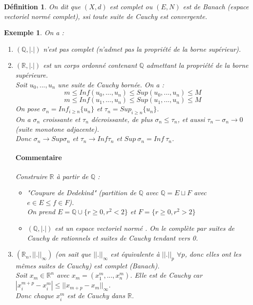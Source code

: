 \documentclass[a4paper, oneside]{report}
\theoremstyle{break}
\newtheorem{defi}[thm]{Définition}
\newtheorem{exem}[thm]{Exemple}
\newcommand{\R}{\mathbb{R}}
\newcommand{\Q}{\mathbb{Q}}
\newcommand{\evn}{espace vectoriel normé }
\begin{document}
\begin{defi}                    
On dit que $(X,d)$ est complet ou $(E,N)$ est de Banach (espace vectoriel normé complet), ssi toute suite de Cauchy est convergente.
\end{defi}

\begin{exem}

On a :
\begin{enumerate}
\item $(\Q, |.|)$ n'est pas complet (n'admet pas la propriété de la borne supérieur).
\item $(\R, |.|)$ est un corps ordonné contenant $\Q$ admettant la propriété de la borne supérieure.\\
Soit $u_0,...,u_n$ une suite de Cauchy bornée. On a :
$$m\leq Inf(u_0,...,u_n)\leq Sup(u_0,...,u_n)\leq M$$
$$m\leq Inf(u_1,...,u_n)\leq Sup(u_1,...,u_n)\leq M$$
On pose $\sigma_n=Inf_{i\geq n}\{u_n\}$ et $\tau_n=Sup_{i\geq n}\{u_n\}$.\\
On a $\sigma_n$ croissante et $\tau_n$ décroissante, de plus $\sigma_n \leq \tau_n$, et aussi $\tau_n - \sigma_n \rightarrow 0$ (suite monotone adjacente).\\
Donc $\sigma_n \rightarrow Sup\sigma_n$ et $\tau_n \rightarrow Inf \tau_n$ et $Sup~\sigma_n = Inf~\tau_n$.

\paragraph{Commentaire}
Construire $\R$ à partir de $\Q$ :
\begin{itemize}
\item "Coupure de Dedekind" (partition de $\Q$ avec $\Q=E\sqcup F$ avec $e\in E \leq f\in F$).\\
On prend $E=\Q \cup \{r\geq 0, r^2<2 \}$ et $F=\{r\geq 0, r^2>2 \}$

\item $(\Q, |.|)$ est un \evn. On le complète par {suites de Cauchy de rationnels} et {suites de Cauchy tendant vers 0}.
\end{itemize}

\item $(\R_n, ||.||_\infty)$ (on sait que $||.||_\infty$ est équivalente à $||.||_p$ $\forall p$, donc elles ont les mêmes suites de Cauchy) est complet (Banach).\\
Soit $x_m \in \R^n$ avec $x_m=(x_1^m,...,x_n^m)$. Elle est de Cauchy car $|x_i^{m+p}-x_i^m| \leq ||x_{m+p}-x_m||_\infty$.\\
Donc chaque $x_i^m$ est de Cauchy dans $\R$.


\end{enumerate}
\end{exem}
\end{document}
